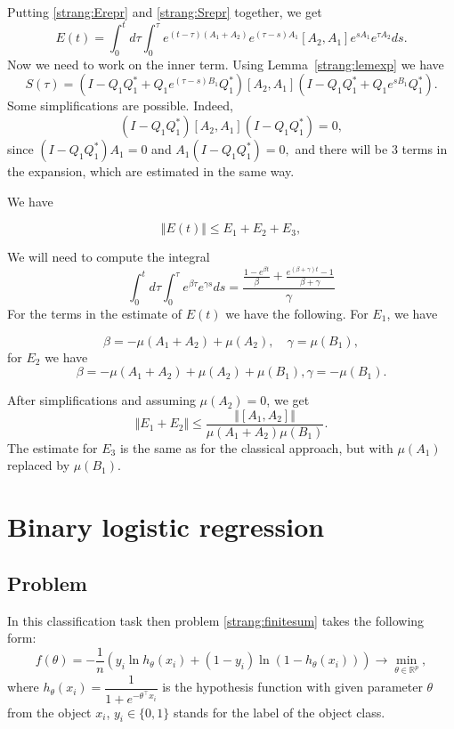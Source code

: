 \documentclass{article} %
\begin{document}
Putting \eqref{strang:Erepr} and \eqref{strang:Srepr} together, we get
\begin{equation}\label{strang:errepr}
E(t) = \int^t_0 d \tau \int^{\tau}_0e^{(t-\tau)(A_1 + A_2)} e^{(\tau - s) A_1}[A_2, A_1] e^{s A_1} e^{\tau A_2} ds.
\end{equation}
Now we need to work on the inner term. Using Lemma~\ref{strang:lemexp} we have
\begin{equation}\label{strang:Sexpr2}
S(\tau) = (I - Q_1 Q^*_1 + Q_1 e^{(\tau - s) B_1} Q_1^* ) [A_2, A_1] \left(I - Q_1 Q^*_1 + Q_1 e^{s B_1} Q_1^* \right).
\end{equation}
Some simplifications are possible. Indeed,
$$(I - Q_1 Q^*_1)[A_2, A_1](I - Q_1 Q^*_1) = 0,$$
since $(I - Q_1 Q^*_1) A_1 = 0$ and $ A_1 (I - Q_1 Q^*_1) = 0,$
and there will be $3$ terms in the expansion, which are estimated in the same way.

We have

$$\Vert E(t) \Vert \leq E_1 + E_2 + E_3,$$


We will need to compute the integral
$$\int^t_0 d \tau \int^{\tau}_0 e^{\beta \tau} e^{\gamma s} ds =
 \frac{\frac{1 - e^{\beta t}}{\beta} + \frac{e^{(\beta + \gamma) t}-1}{\beta + \gamma}}{\gamma}
$$
For the terms in the estimate of $E(t)$ we have the following. For $E_1$, we have

$$\beta = -\mu(A_1 + A_2) + \mu(A_2), \quad \gamma = \mu(B_1), $$
for $E_2$
we have
$$\beta = -\mu(A_1 + A_2) + \mu(A_2) + \mu(B_1), \gamma = -\mu(B_1).$$

After simplifications and assuming $\mu(A_2) = 0$, we get
$$\Vert E_1 + E_2 \Vert \leq  \frac{\Vert [A_1, A_2]\Vert}{\mu(A_1 + A_2) \mu(B_1)}.  $$
The estimate for $E_3$ is the same as for the classical approach, but with $\mu(A_1)$ replaced by $\mu(B_1)$.

\section{Binary logistic regression}
\subsection{Problem}
In this classification task then problem \eqref{strang:finitesum} takes the following form:
\begin{equation}\label{strang:LogReg}
   f(\theta) = -\dfrac{1}{n} \left(y_i \ln h_{\theta}(x_i)  + (1-y_i) \ln (1-h_{\theta}(x_i))\right) \to \min_{\theta \in \mathbb{R}^p},
\end{equation}
where $h_\theta(x_i) = \dfrac{1}{1 + e^{-\theta^\top x_i}}$ is the hypothesis function with given parameter $\theta$ from the object $x_i$, $ y_i \in \{0,1\}$ stands for the label of the object class.
\end{document}
